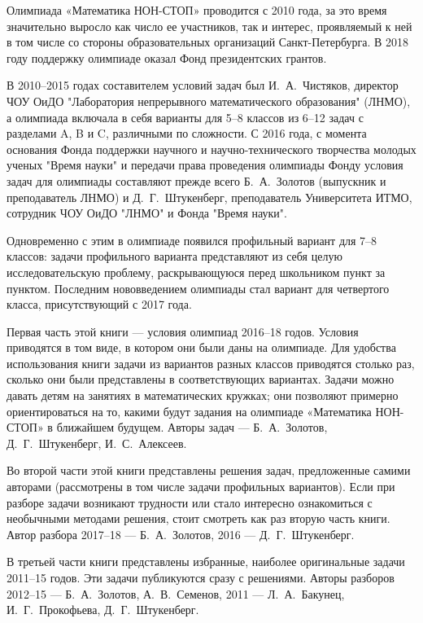 \noindent\abz Олимпиада «Математика НОН-СТОП» проводится с 2010 года, за это время значительно выросло как число ее участников, так и интерес, проявляемый к ней в том числе со стороны образовательных организаций Санкт-Петербурга. В 2018 году поддержку олимпиаде оказал Фонд президентских грантов. 

\aabz В 2010–2015 годах составителем условий задач был И.~А.~Чистяков, директор ЧОУ ОиДО "Лаборатория непрерывного математического образования" (ЛНМО), а олимпиада включала в себя варианты для 5–8 классов из 6–12 задач с разделами  A, B и C, различными по сложности. С 2016 года, с момента основания Фонда поддержки научного и научно-технического творчества молодых ученых "Время науки" и передачи права проведения олимпиады Фонду условия задач для олимпиады составляют прежде всего Б.~А.~Золотов (выпускник и преподаватель ЛНМО) и Д.~Г.~Штукенберг, преподаватель Университета ИТМО, сотрудник ЧОУ ОиДО "ЛНМО" и Фонда "Время науки". 

\aabz Одновременно с этим в олимпиаде появился профильный вариант для 7–8 классов: задачи профильного варианта представляют из себя целую исследовательскую проблему, раскрывающуюся перед школьником пункт за пунктом. Последним нововведением олимпиады стал вариант для четвертого класса, присутствующий с 2017 года.

\aabz Первая часть этой книги — условия олимпиад 2016–18 годов. Условия приводятся в том виде, в котором они были даны на олимпиаде. Для удобства использования книги задачи из вариантов разных классов приводятся столько раз, сколько они были представлены в соответствующих вариантах. Задачи можно давать детям на занятиях в математических кружках; они позволяют примерно ориентироваться на то, какими будут задания на олимпиаде «Математика НОН-СТОП» в ближайшем будущем. Авторы задач — Б.~А.~Золотов, Д.~Г.~Штукенберг, И.~С.~Алексеев.

\aabz Во второй части этой книги представлены решения задач, предложенные самими авторами (рассмотрены в том числе задачи профильных вариантов). Если при разборе задачи возникают трудности или стало интересно ознакомиться с необычными методами решения, стоит смотреть как раз вторую часть книги. Автор разбора 2017–18 — Б.~А.~Золотов, 2016 — Д.~Г.~Штукенберг.

\aabz В третьей части книги представлены избранные, наиболее оригинальные задачи 2011–15 годов. Эти задачи публикуются сразу с решениями. Авторы разборов 2012–15 — Б.~А.~Золотов, А.~В.~Семенов, 2011 — Л.~А.~Бакунец, И.~Г.~Прокофьева, Д.~Г.~Штукенберг.

